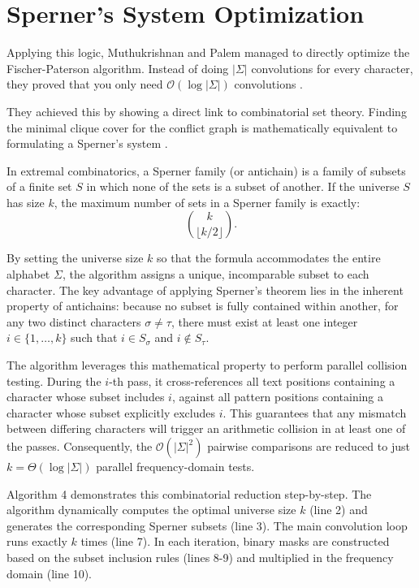 \section{Sperner's System Optimization}
Applying this logic, Muthukrishnan and Palem managed to directly optimize the Fischer-Paterson algorithm. Instead of doing $|\Sigma|$ convolutions for every character, they proved that you only need $\mathcal{O}(\log |\Sigma|)$ convolutions \cite{mp1994}. 

They achieved this by showing a direct link to combinatorial set theory. Finding the minimal clique cover for the conflict graph is mathematically equivalent to formulating a Sperner's system \cite{mp1994}.

\begin{theorem}
In extremal combinatorics, a Sperner family (or antichain) is a family of subsets of a finite set $S$ in which none of the sets is a subset of another. If the universe $S$ has size $k$, the maximum number of sets in a Sperner family is exactly:
\begin{equation*}
    \binom{k}{\lfloor k/2 \rfloor}.
\end{equation*}
\end{theorem}

By setting the universe size $k$ so that the formula accommodates the entire alphabet $\Sigma$, the algorithm assigns a unique, incomparable subset to each character. The key advantage of applying Sperner's theorem lies in the inherent property of antichains: because no subset is fully contained within another, for any two distinct characters $\sigma \neq \tau$, there must exist at least one integer $i \in \{1, \dots, k\}$ such that $i \in S_\sigma$ and $i \notin S_\tau$. 

The algorithm leverages this mathematical property to perform parallel collision testing. During the $i$-th pass, it cross-references all text positions containing a character whose subset includes $i$, against all pattern positions containing a character whose subset explicitly excludes $i$. This guarantees that any mismatch between differing characters will trigger an arithmetic collision in at least one of the passes. Consequently, the $\mathcal{O}(|\Sigma|^2)$ pairwise comparisons are reduced to just $k = \Theta(\log |\Sigma|)$ parallel frequency-domain tests.

Algorithm 4 demonstrates this combinatorial reduction step-by-step. The algorithm dynamically computes the optimal universe size $k$ (line 2) and generates the corresponding Sperner subsets (line 3). The main convolution loop runs exactly $k$ times (line 7). In each iteration, binary masks are constructed based on the subset inclusion rules (lines 8-9) and multiplied in the frequency domain (line 10). 


